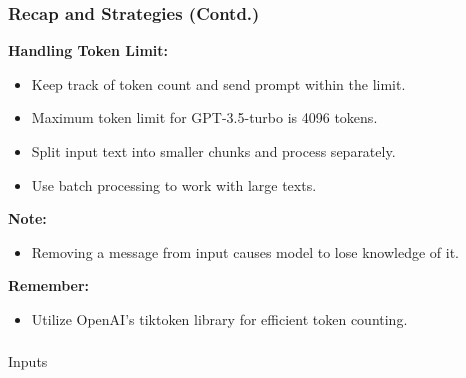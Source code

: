 \begin{frame}[fragile]
\frametitle{Recap and Strategies (Contd.)}

\textbf{Handling Token Limit:}
\begin{itemize}
    \item Keep track of token count and send prompt within the limit.
    \item Maximum token limit for GPT-3.5-turbo is 4096 tokens.
    \item Split input text into smaller chunks and process separately.
    \item Use batch processing to work with large texts.
\end{itemize}

\textbf{Note:}
\begin{itemize}
    \item Removing a message from input causes model to lose knowledge of it.
\end{itemize}

\textbf{Remember:}
\begin{itemize}
    \item Utilize OpenAI's tiktoken library for efficient token counting.
\end{itemize}

\end{frame}

\begin{frame}[fragile]\frametitle{}
\begin{center}
{\Large Inputs}
\end{center}
\end{frame}

